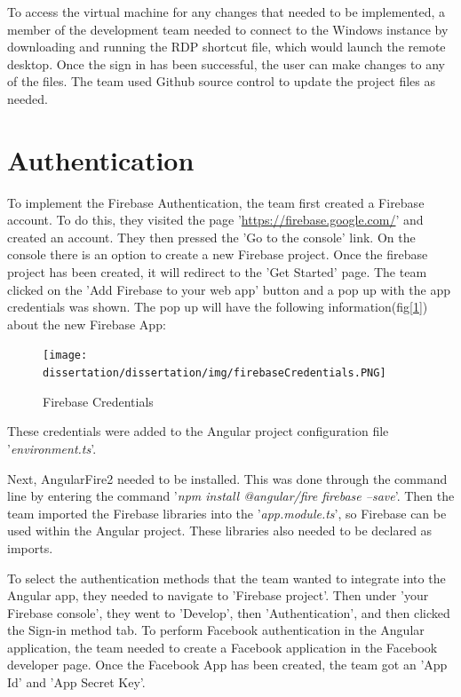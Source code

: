 \bigskip

To access the virtual machine for any changes that needed to be implemented, a member of the development team needed to connect to the Windows instance by downloading and running the RDP shortcut file, which would launch the remote desktop. Once the sign in has been successful, the user can make changes to any of the files. The team used Github source control to update the project files as needed.

\section{Authentication}
\label{sec:SystemDesignAuthentication}
To implement the Firebase Authentication, the team first created a Firebase account. To do this, they visited the page '\href{https://firebase.google.com/}{https://firebase.google.com/}' and created an account. They then pressed the 'Go to the console' link. On the console there is an option to create a new Firebase project. Once the firebase project has been created, it will redirect to the 'Get Started' page. The team clicked on the 'Add Firebase to your web app' button and a pop up with the app credentials was shown. The pop up will have the following information(fig[\ref{fig:credentials}]) about the new Firebase App:

\begin{figure}[H]
    \centering
    \texttt{[image: dissertation/dissertation/img/firebaseCredentials.PNG]}
    \caption{Firebase Credentials}
    \label{fig:credentials}
\end{figure}
These credentials were added to the Angular project configuration file '\textit{environment.ts}'.

Next, AngularFire2 needed to be installed. This was done through the command line by entering the command '\textit{npm install @angular/fire firebase --save}'. Then the team imported the Firebase libraries into the '\textit{app.module.ts}', so Firebase can be used within the Angular project. These libraries also needed to be declared as imports.

\bigskip

To select the authentication methods that the team wanted to integrate into the Angular app, they needed to navigate to 'Firebase project'. Then under 'your Firebase console', they went to 'Develop', then 'Authentication', and then clicked the Sign-in method tab. To perform Facebook authentication in the Angular application, the team needed to create a Facebook application in the Facebook developer page. Once the Facebook App has been created, the team got an 'App Id' and 'App Secret Key'.


